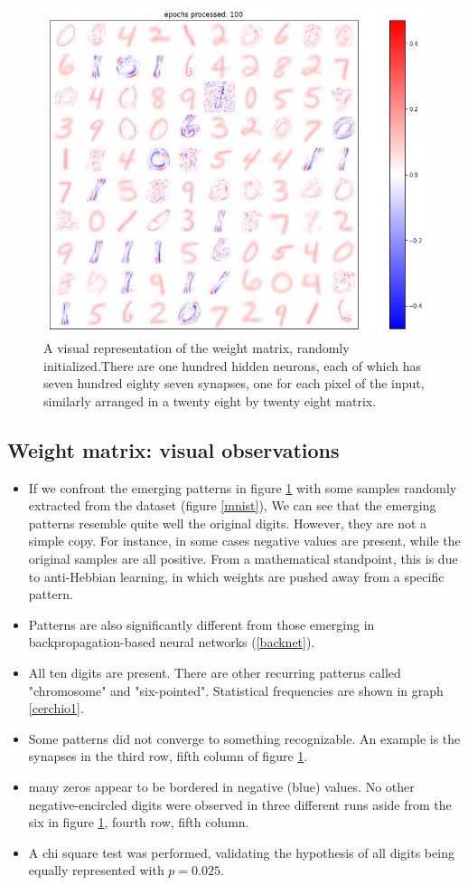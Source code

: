 \documentclass[a4paper]{report}
\begin{document}
\begin{figure} [H]
    \centering
    \includegraphics [width=12cm ] {h/uu_heatmap.png}
    \caption{A visual representation of the weight matrix, randomly initialized.There are one hundred hidden neurons, each of which has seven hundred eighty seven synapses, one for each pixel of the input, similarly arranged in a twenty eight by twenty eight matrix.}
    \label{heatmap}
\end{figure}

\subsection{Weight matrix: visual observations}

\begin{itemize}
    \item If we confront the emerging patterns in figure \ref{heatmap} with some samples randomly extracted from the dataset (figure \ref{mnist}), We can see that the emerging patterns resemble quite well the original digits. However, they are not a simple copy. For instance, in some cases negative values are present, while the original samples are all positive. From a mathematical standpoint, this is due to anti-Hebbian learning, in which weights are pushed away from a specific pattern.
    \item Patterns are also significantly different from those emerging in backpropagation-based neural networks (\ref{backnet}).
    \item All ten digits are present. There are other recurring patterns called "chromosome" and "six-pointed". Statistical frequencies are shown in graph \ref{cerchio1}.
    \item Some patterns did not converge to something recognizable. An example is the synapses in the third row, fifth column of figure \ref{heatmap}.
    \item many zeros appear to be bordered in negative (blue) values. No other negative-encircled digits were observed in three different runs aside from the six in figure \ref{heatmap}, fourth row, fifth column.
    \item A chi square test was performed, validating the hypothesis of all digits being equally represented with $p  = 0.025$.
    \end{itemize}
\end{document}
